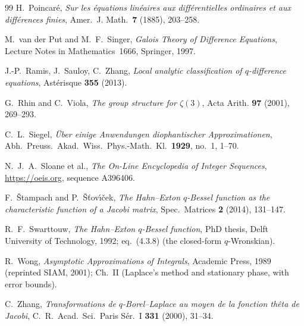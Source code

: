 \documentclass[11pt]{article}
\theoremstyle{plain}
\theoremstyle{definition}
\theoremstyle{remark}
\begin{document}
\begin{thebibliography}{99}
 H.~Poincar\'e, \emph{Sur les \'equations lin\'eaires aux diff\'erentielles
ordinaires et aux diff\'erences finies}, Amer.\ J. Math.\ \textbf{7} (1885), 203--258.

 M.~van der Put and M.~F.~Singer, \emph{Galois Theory of Difference
Equations}, Lecture Notes in Mathematics~1666, Springer, 1997.

 J.-P.~Ramis, J.~Sauloy, C.~Zhang, \emph{Local analytic classification of
$q$-difference equations}, Ast\'erisque \textbf{355} (2013).

 G.~Rhin and C.~Viola, \emph{The group structure for $\zeta(3)$}, Acta Arith.
\textbf{97} (2001), 269--293.

 C.~L.~Siegel, \emph{\"Uber einige Anwendungen diophantischer Approximationen},
Abh.\ Preuss.\ Akad.\ Wiss.\ Phys.-Math.\ Kl.\ \textbf{1929}, no.~1, 1--70.

 N.~J.~A.~Sloane et al., \emph{The On-Line Encyclopedia of Integer Sequences},
\url{https://oeis.org}, sequence A396406.

 F.~\v{S}tampach and P.~\v{S}\v{t}ov\'{\i}\v{c}ek, \emph{The
Hahn--Exton $q$-Bessel function as the characteristic function of a Jacobi matrix}, Spec.\
Matrices \textbf{2} (2014), 131--147.

 R.~F.~Swarttouw, \emph{The Hahn--Exton $q$-Bessel function}, PhD thesis,
Delft University of Technology, 1992; eq.~(4.3.8) (the closed-form $q$-Wronskian).

 R.~Wong, \emph{Asymptotic Approximations of Integrals}, Academic Press, 1989
(reprinted SIAM, 2001); Ch.~II (Laplace's method and stationary phase, with error bounds).

 C.~Zhang, \emph{Transformations de $q$-Borel--Laplace au moyen de la fonction
th\^eta de Jacobi}, C.\ R.\ Acad.\ Sci.\ Paris S\'er.\ I \textbf{331} (2000), 31--34.
\end{thebibliography}
\end{document}

